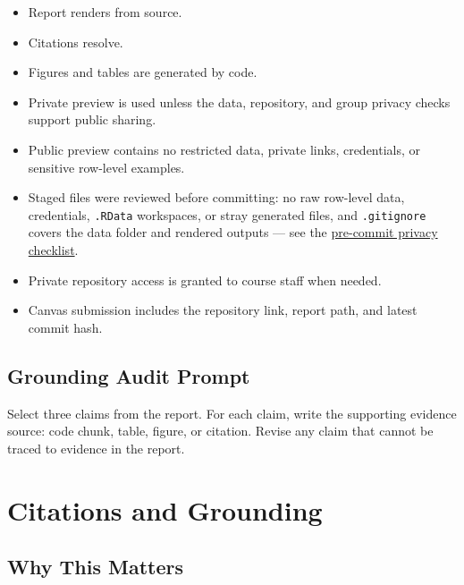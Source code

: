 \documentclass[
  letterpaper,
  DIV=11,
  numbers=noendperiod,
  oneside]{scrreprt}
\providecommand{\tightlist}{%
  \setlength{\itemsep}{0pt}\setlength{\parskip}{0pt}}
\begin{document}
\begin{itemize}
\tightlist
\item
  Report renders from source.
\item
  Citations resolve.
\item
  Figures and tables are generated by code.
\item
  Private preview is used unless the data, repository, and group privacy
  checks support public sharing.
\item
  Public preview contains no restricted data, private links,
  credentials, or sensitive row-level examples.
\item
  Staged files were reviewed before committing: no raw row-level data,
  credentials, \texttt{.RData} workspaces, or stray generated files, and
  \texttt{.gitignore} covers the data folder and rendered outputs ---
  see the \href{report04-private-preview.qmd}{pre-commit privacy
  checklist}.
\item
  Private repository access is granted to course staff when needed.
\item
  Canvas submission includes the repository link, report path, and
  latest commit hash.
\end{itemize}

\section*{Grounding Audit Prompt}\label{grounding-audit-prompt}


Select three claims from the report. For each claim, write the
supporting evidence source: code chunk, table, figure, or citation.
Revise any claim that cannot be traced to evidence in the report.

\chapter*{Citations and Grounding}\label{citations-and-grounding}


\section*{Why This Matters}\label{why-this-matters-2}
\end{document}
